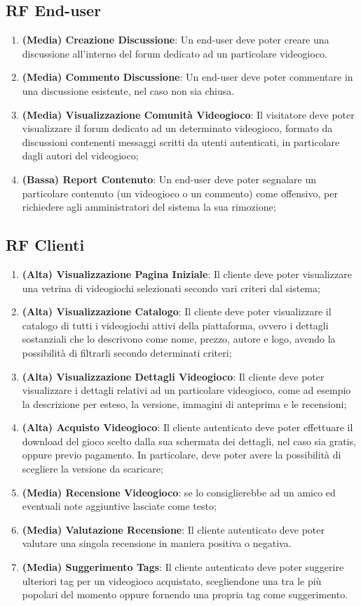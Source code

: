 \subsection{RF End-user}
\begin{enumerate}
	\item \textbf{(Media) Creazione Discussione}: Un end-user deve poter creare una discussione all’interno del forum dedicato ad un particolare videogioco.
	\item \textbf{(Media) Commento Discussione}: Un end-user deve poter commentare in una discussione esistente, nel caso non sia chiusa.
	\item \textbf{(Media) Visualizzazione Comunità Videogioco}: Il visitatore deve poter visualizzare il forum dedicato ad un determinato videogioco, formato da discussioni contenenti messaggi scritti da utenti autenticati, in particolare dagli autori del videogioco;
	\item \textbf{(Bassa) Report Contenuto}: Un end-user deve poter segnalare un particolare contenuto (un videogioco o un commento) come offensivo, per richiedere agli amministratori del sistema la sua rimozione;
\end{enumerate}

\subsection{RF Clienti}
\begin{enumerate}
	\item \textbf{(Alta) Visualizzazione Pagina Iniziale}: Il cliente deve poter visualizzare una vetrina di videogiochi selezionati secondo vari criteri dal sistema;
	\item \textbf{(Alta) Visualizzazione Catalogo}: Il cliente deve poter visualizzare il catalogo di tutti i videogiochi attivi della piattaforma, ovvero i dettagli sostanziali che lo descrivono come nome, prezzo, autore e logo, avendo la possibilità di filtrarli secondo determinati criteri;
	\item \textbf{(Alta) Visualizzazione Dettagli Videogioco}: Il cliente deve poter visualizzare i dettagli relativi ad un particolare videogioco, come ad esempio la descrizione per esteso, la versione, immagini di anteprima e le recensioni;
	\item \textbf{(Alta) Acquisto Videogioco}: Il cliente autenticato deve poter effettuare il download del gioco scelto dalla sua schermata dei dettagli, nel caso sia gratis, oppure previo pagamento. In particolare, deve poter avere la possibilità di scegliere la versione da scaricare;
	\item \textbf{(Media) Recensione Videogioco}: se lo consiglierebbe ad un amico ed eventuali note aggiuntive lasciate come testo;
	\item \textbf{(Media) Valutazione Recensione}: Il cliente autenticato deve poter valutare una singola recensione in maniera positiva o negativa.
	\item \textbf{(Media) Suggerimento Tags}: Il cliente autenticato deve poter suggerire ulteriori tag per un videogioco acquistato, scegliendone una tra le più popolari del momento oppure fornendo una propria tag come suggerimento.	
\end{enumerate}

